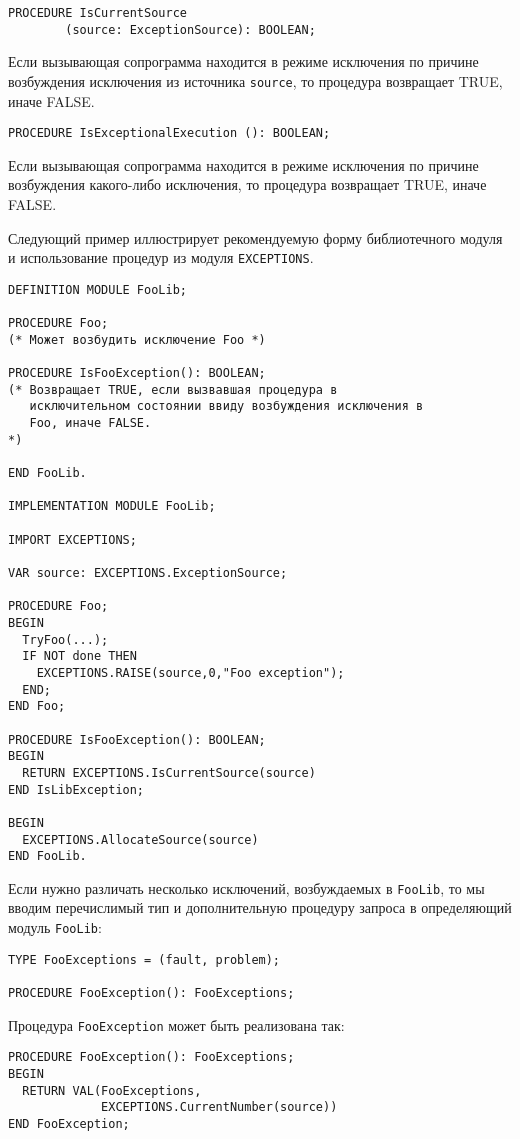 \begin{verbatim}
PROCEDURE IsCurrentSource
        (source: ExceptionSource): BOOLEAN;
\end{verbatim}

Если вызывающая сопрограмма находится в режиме исключения по 
причине возбуждения исключения из источника
{\tt source}, то процедура возвращает TRUE, иначе FALSE.

\begin{verbatim}
PROCEDURE IsExceptionalExecution (): BOOLEAN;
\end{verbatim}

Если вызывающая сопрограмма находится в режиме исключения по 
причине возбуждения какого-либо исключения,
то процедура возвращает TRUE, иначе FALSE.

Следующий пример иллюстрирует рекомендуемую форму библиотечного модуля
и использование процедур из модуля {\tt EXCEPTIONS}.
\begin{verbatim}
DEFINITION MODULE FooLib;

PROCEDURE Foo;
(* Может возбудить исключение Foo *)

PROCEDURE IsFooException(): BOOLEAN;
(* Возвращает TRUE, если вызвавшая процедура в
   исключительном состоянии ввиду возбуждения исключения в
   Foo, иначе FALSE.
*)

END FooLib.

IMPLEMENTATION MODULE FooLib;

IMPORT EXCEPTIONS;

VAR source: EXCEPTIONS.ExceptionSource;

PROCEDURE Foo;
BEGIN
  TryFoo(...);
  IF NOT done THEN
    EXCEPTIONS.RAISE(source,0,"Foo exception");
  END;
END Foo;

PROCEDURE IsFooException(): BOOLEAN;
BEGIN
  RETURN EXCEPTIONS.IsCurrentSource(source)
END IsLibException;

BEGIN
  EXCEPTIONS.AllocateSource(source)
END FooLib.
\end{verbatim}

Если нужно различать несколько исключений, возбуждаемых в {\tt FooLib},
то мы вводим перечислимый тип и дополнительную процедуру запроса
в определяющий модуль {\tt FooLib}:
\begin{verbatim}
TYPE FooExceptions = (fault, problem);

PROCEDURE FooException(): FooExceptions;
\end{verbatim}
Процедура {\tt FooException} может быть реализована так:
\begin{verbatim}
PROCEDURE FooException(): FooExceptions;
BEGIN
  RETURN VAL(FooExceptions,
             EXCEPTIONS.CurrentNumber(source))
END FooException;
\end{verbatim}

